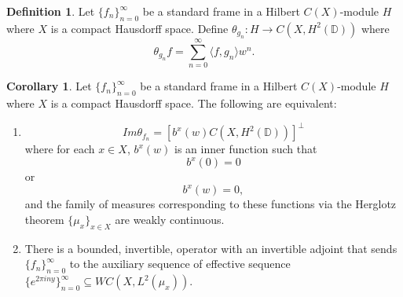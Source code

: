 \documentclass[11pt]{amsart}
\theoremstyle{definition}
\newtheorem{defn}[thm]{Definition}
\newtheorem{cor}{Corollary}[section]
\numberwithin{equation}{section}
\begin{document}
\begin{defn}
Let $\{f_{n}\}_{n=0}^{\infty}$ be a standard frame in a Hilbert $C(X)$-module $H$ where $X$ is a compact Hausdorff space. Define $\theta_{g_{n}}: H\to C(X, H^{2}(\mathbb{D}))$ where
$$\theta_{g_{n}}f=\sum_{n=0}^{\infty}\langle f, g_{n}\rangle w^{n}.$$
\end{defn}

\begin{cor}\label{equivalenttoauxcor}
Let $\{f_{n}\}_{n=0}^{\infty}$ be a standard frame in a Hilbert $C(X)$-module $H$ where $X$ is a compact Hausdorff space. The following are equivalent:

\begin{enumerate}
    \item $$Im\theta_{f_{n}}=[b^{x}(w)C(X, H^{2}(\mathbb{D}))]^{\perp}$$ where for each $x\in X$, $b^{x}(w)$ is an inner function such that $$b^{x}(0)=0$$ or $$b^{x}(w)=0,$$ and the family of measures corresponding to these functions via the Herglotz theorem $\{\mu_{x}\}_{x\in X}$ are weakly continuous.
    \item There is a bounded, invertible, operator with an invertible adjoint that sends $\{f_{n}\}_{n=0}^{\infty}$ to the auxiliary sequence of effective sequence $\{e^{2\pi i ny}\}_{n=0}^{\infty}\subseteq WC(X, L^{2}(\mu_{x}))$.
\end{enumerate}


\end{cor}
\end{document}
